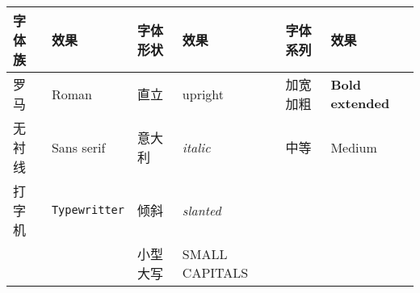 \documentclass{ctexart}
\begin{document}
\begin{tabular}{|ll|ll|ll|}
\hline
字体族 & 效果 & 字体形状 & 效果 & 字体系列 & 效果 \\
\hline
罗马 & \textrm{Roman} & 直立 & \textup{upright} & 加宽加粗 & \textbf{Bold extended} \\
无衬线 & \textsf{Sans serif} & 意大利 & \textit{italic} & 中等 & \textmd{Medium} \\
打字机 & \texttt{Typewritter} & 倾斜 & \textsl{slanted} & & \\
& & 小型大写 & \textsc{SMALL CAPITALS} & & \\
\hline
\end{tabular}
\end{document}
